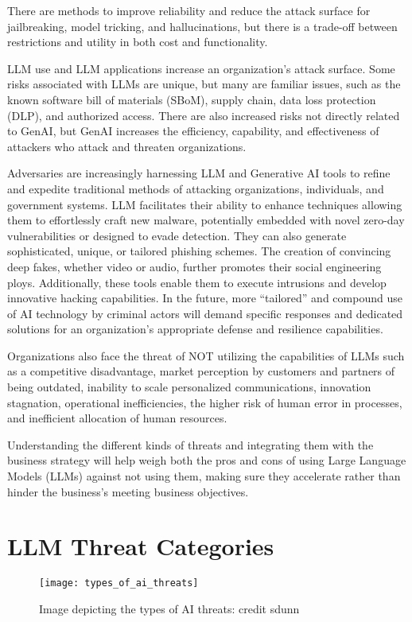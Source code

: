 There are methods to improve reliability and reduce the attack surface for jailbreaking, model tricking, and hallucinations, but there is a trade-off between restrictions and utility in both cost and functionality.

LLM use and LLM applications increase an organization's attack surface. Some risks associated with LLMs are unique, but many are familiar issues, such as the known software bill of materials (SBoM), supply chain, data loss protection (DLP), and authorized access. There are also increased risks not directly related to GenAI, but GenAI increases the efficiency, capability, and effectiveness of attackers who attack and threaten organizations.

Adversaries are increasingly harnessing LLM and Generative AI tools to refine and expedite traditional methods of attacking organizations, individuals, and government systems. LLM facilitates their ability to enhance techniques allowing them to effortlessly craft new malware, potentially embedded with novel zero-day vulnerabilities or designed to evade detection. They can also generate sophisticated, unique, or tailored phishing schemes. The creation of convincing deep fakes, whether video or audio, further promotes their social engineering ploys. Additionally, these tools enable them to execute intrusions and develop innovative hacking capabilities. In the future, more “tailored” and compound use of AI technology by criminal actors will demand specific responses and dedicated solutions for an organization's appropriate defense and resilience capabilities.

Organizations also face the threat of NOT utilizing the capabilities of LLMs such as a competitive disadvantage, market perception by customers and partners of being outdated, inability to scale personalized communications, innovation stagnation, operational inefficiencies, the higher risk of human error in processes, and inefficient allocation of human resources.


Understanding the different kinds of threats and integrating them with the business strategy will help weigh both the pros and cons of using Large Language Models (LLMs) against not using them, making sure they accelerate rather than hinder the business's meeting business objectives.

\section{LLM Threat Categories}
\begin{figure}[h]
  \centering
  \texttt{[image: types\_of\_ai\_threats]}
  \caption{Image depicting the types of AI threats: credit sdunn}
  \label{fig:types-of-ai-threats}
\end{figure}

